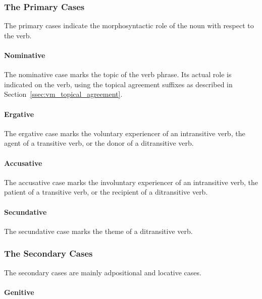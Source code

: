 \documentclass[grammar]{subfiles}
\begin{document}
  \subsubsection{The Primary Cases}
  \label{sssec:nm_primary_cases}

  The primary cases indicate the morphosyntactic role of the noun with respect to the verb.

  \paragraph{Nominative}
  \label{par:nm_nominative_case}

  The nominative case marks the topic of the verb phrase. Its actual role is indicated on the verb, using the topical agreement suffixes as described in Section~\ref{ssec:vm_topical_agreement}.

  \paragraph{Ergative}
  \label{par:nm_ergative_case}

  The ergative case marks the voluntary experiencer of an intransitive verb, the agent of a transitive verb, or the donor of a ditransitive verb.

  \paragraph{Accusative}
  \label{par:nm_accusative_case}

  The accusative case marks the involuntary experiencer of an intransitive verb, the patient of a transitive verb, or the recipient of a ditransitive verb.

  \paragraph{Secundative}
  \label{par:nm_secundative_case}

  The secundative case marks the theme of a ditransitive verb.

  \subsubsection{The Secondary Cases}
  \label{sssec:nm_secondary_cases}

  The secondary cases are mainly adpositional and locative cases.

  \paragraph{Genitive}
  \label{par:nm_genitive_case}
\end{document}
